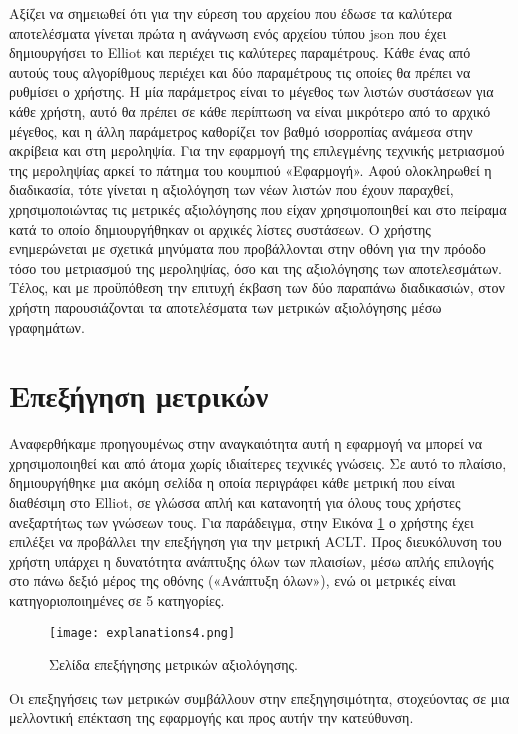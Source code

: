  \noindent Αξίζει να σημειωθεί ότι για την εύρεση του αρχείου που έδωσε τα καλύτερα αποτελέσματα γίνεται πρώτα η ανάγνωση ενός αρχείου τύπου json που έχει δημιουργήσει το Elliot και περιέχει τις καλύτερες παραμέτρους. Κάθε ένας από αυτούς τους αλγορίθμους περιέχει και δύο παραμέτρους τις οποίες θα πρέπει να ρυθμίσει ο χρήστης. Η μία παράμετρος είναι το μέγεθος των λιστών συστάσεων για κάθε χρήστη, αυτό θα πρέπει σε κάθε περίπτωση να είναι μικρότερο από το αρχικό μέγεθος, και η άλλη παράμετρος καθορίζει τον βαθμό ισορροπίας ανάμεσα στην ακρίβεια και στη μεροληψία. Για την εφαρμογή της επιλεγμένης τεχνικής μετριασμού της μεροληψίας αρκεί το πάτημα του κουμπιού «Εφαρμογή». Αφού ολοκληρωθεί η διαδικασία, τότε γίνεται η αξιολόγηση των νέων λιστών που έχουν παραχθεί, χρησιμοποιώντας τις μετρικές αξιολόγησης που είχαν χρησιμοποιηθεί και στο πείραμα κατά το οποίο δημιουργήθηκαν οι αρχικές λίστες συστάσεων. Ο χρήστης ενημερώνεται με σχετικά μηνύματα που προβάλλονται στην οθόνη για την πρόοδο τόσο του μετριασμού της μεροληψίας, όσο και της αξιολόγησης των αποτελεσμάτων. Τέλος, και με προϋπόθεση την επιτυχή έκβαση των δύο παραπάνω διαδικασιών, στον χρήστη παρουσιάζονται τα αποτελέσματα των μετρικών αξιολόγησης μέσω γραφημάτων.
\newpage
\section{Επεξήγηση μετρικών}
\noindent Αναφερθήκαμε προηγουμένως στην αναγκαιότητα αυτή η εφαρμογή να μπορεί να χρησιμοποιηθεί και από άτομα χωρίς ιδιαίτερες τεχνικές γνώσεις. Σε αυτό το πλαίσιο, δημιουργήθηκε μια ακόμη σελίδα η οποία περιγράφει κάθε μετρική που είναι διαθέσιμη στο Elliot, σε γλώσσα απλή και κατανοητή για όλους τους χρήστες ανεξαρτήτως των γνώσεων τους. Για παράδειγμα, στην Εικόνα \ref{fig:explain} ο χρήστης έχει επιλέξει να προβάλλει την επεξήγηση για την μετρική ACLT. Προς διευκόλυνση του χρήστη υπάρχει η δυνατότητα ανάπτυξης όλων των πλαισίων, μέσω απλής επιλογής στο πάνω δεξιό μέρος της οθόνης («Ανάπτυξη όλων»), ενώ οι μετρικές είναι κατηγοριοποιημένες σε 5 κατηγορίες.
\begin{figure}[H]
	\centering
	\texttt{[image: explanations4.png]}
	\caption{Σελίδα επεξήγησης μετρικών αξιολόγησης.}
	\label{fig:explain}
\end{figure}
\noindent Οι επεξηγήσεις των μετρικών συμβάλλουν στην επεξηγησιμότητα, στοχεύοντας σε μια μελλοντική επέκταση της εφαρμογής και προς αυτήν την κατεύθυνση.
\newpage
